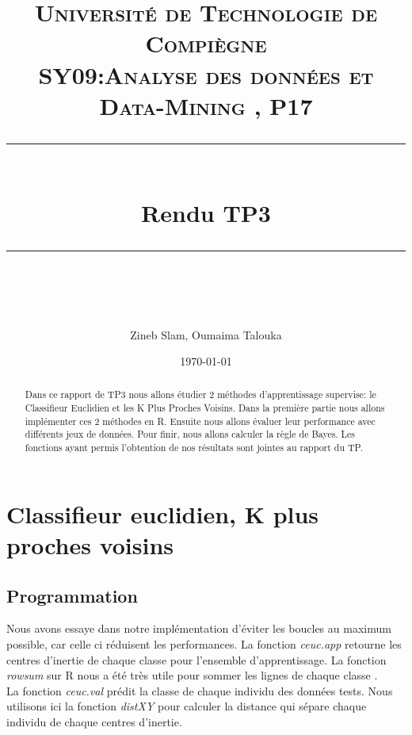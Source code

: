 \documentclass[10pt]{article}
\title{
	\normalfont \normalsize 
	\textsc{Université de Technologie de Compiègne\\ 
		SY09:Analyse des données et Data-Mining , P17} \\
	[10pt] 
	\rule{\linewidth}{0.5pt} \\[6pt] 
	\huge Rendu TP3\\
	\rule{\linewidth}{2pt}  \\[10pt]
}
\author{Zineb Slam, Oumaima Talouka}
\date{\normalsize \today}
\begin{document}
	{\let\newpage\relax\maketitle}	
	
		\begin{abstract}
			Dans ce rapport de TP3 nous allons étudier 2 méthodes d'apprentissage supervise: le Classifieur Euclidien et les K Plus Proches Voisins. Dans la première partie nous allons implémenter ces 2 méthodes en R. Ensuite nous allons évaluer leur performance avec différents jeux de données. Pour finir, nous allons calculer la règle de Bayes. Les fonctions ayant permis l'obtention de nos résultats sont jointes au rapport du TP.
		\end{abstract}
	
	\section{Classifieur euclidien, K plus proches voisins}
		\subsection{ Programmation}
		Nous avons essaye dans notre implémentation d'éviter les boucles au maximum possible, car celle ci réduisent les performances.
	La fonction \textit{ceuc.app } retourne les centres d'inertie de chaque classe pour l'ensemble d'apprentissage. La fonction \textit{rowsum} sur R nous a été très utile pour sommer les lignes de chaque classe .\\
	La fonction \textit{ceuc.val}  prédit la classe de chaque individu des données tests. Nous utilisons ici la fonction \textit{distXY} pour calculer la distance qui sépare chaque individu de chaque centres d'inertie.
	
	
\end{document}
